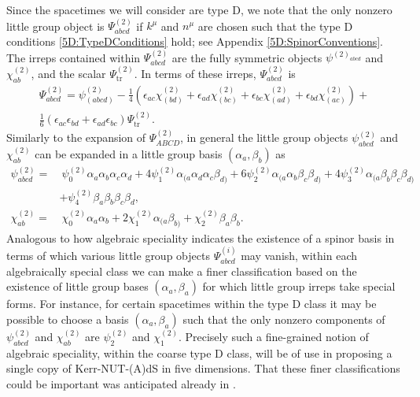 Since the spacetimes we will consider are type D, we note that the only nonzero little
group object is $\Psi^{(2)}_{abcd}$ if $k^{\mu}$ and $n^{\mu}$ are chosen such that the type D conditions
\eqref{5D:TypeDConditions} hold; see Appendix \ref{5D:SpinorConventions}. The irreps contained within
$\Psi^{(2)}_{abcd}$ are the fully symmetric objects $\psi^{(2)_{abcd}}$ and $\chi^{(2)}_{ab}$, and the scalar
$\Psi^{(2)}_{\mathrm{tr}}$. In terms of these irreps, $\Psi^{(2)}_{abcd}$ is
%
\begin{multline} \label{5D:LittleGroup2Irreps} 
    \Psi^{(2)}_{abcd} = \psi^{(2)}_{(abcd)} - \frac{1}{4} \left( \epsilon_{ac}
    \chi^{(2)}_{(bd)} + \epsilon_{ad} \chi^{(2)}_{(bc)} + \epsilon_{bc} \chi^{(2)}_{(ad)}
+ \epsilon_{bd} \chi^{(2)}_{(ac)}\right) + \\
\frac{1}{6} \left( \epsilon_{ac}\epsilon_{bd} +
\epsilon_{ad} \epsilon_{bc}\right) \Psi^{(2)}_{\mathrm{tr}}.
\end{multline}
%
Similarly to the expansion of $\Psi^{(2)}_{ABCD}$, in general the little group objects
$\psi^{(2)}_{abcd}$ and $\chi^{(2)}_{ab}$ can be expanded in a little group basis $(\alpha_{a}, \beta_{b})$ as
%
\begin{equation} \label{5D:IrrepExpansion} 
    \begin{split}
        \psi^{(2)}_{abcd} = &\ \psi_{0}^{(2)} \alpha_{a} \alpha_{b} \alpha_{c} \alpha_{d} + 4
    \psi_{1}^{(2)} \alpha_{(a} \alpha_{d} \alpha_{c} \beta_{d)} + 6\psi^{(2)}_{2} \alpha_{(a} \alpha_{b} \beta_{c}
    \beta_{d)} + 4 \psi^{(2)}_{3} \alpha_{(a} \beta_{b} \beta_{c} \beta_{d)}\\
                            & + \psi^{(2)}_{4} \beta_{a} \beta_{b} \beta_{c} \beta_{d}, \\
        \chi^{(2)}_{ab} = &\ \chi_{0}^{(2)} \alpha_{a} \alpha_{b} + 2 \chi_{1}^{(2)} \alpha_{(a}
    \beta_{b)} + \chi_{2}^{(2)} \beta_{a} \beta_{b}.
    \end{split}
\end{equation}
%
Analogous to how algebraic speciality indicates the existence of a spinor basis in terms of which various little
group objects $\Psi^{(i)}_{abcd}$ may vanish, within each algebraically special class we can make a finer
classification based on the existence of little group bases $(\alpha_{a}, \beta_{a})$ for which little group
irreps take special forms. For instance, for certain spacetimes within the type D class it may be possible to
choose a basis $(\alpha_{a}, \beta_{a})$ such that the only nonzero components of $\psi^{(2)}_{abcd}$
and $\chi^{(2)}_{ab}$ are $\psi_{2}^{(2)}$ and $\chi^{(2)}_{1}$. Precisely such a fine-grained notion of algebraic
speciality, within the coarse type D class, will be of use in proposing a single copy of Kerr-NUT-(A)dS in five
dimensions. That these finer classifications could be important was anticipated already in \cite{Monteiro:2018xev}.



